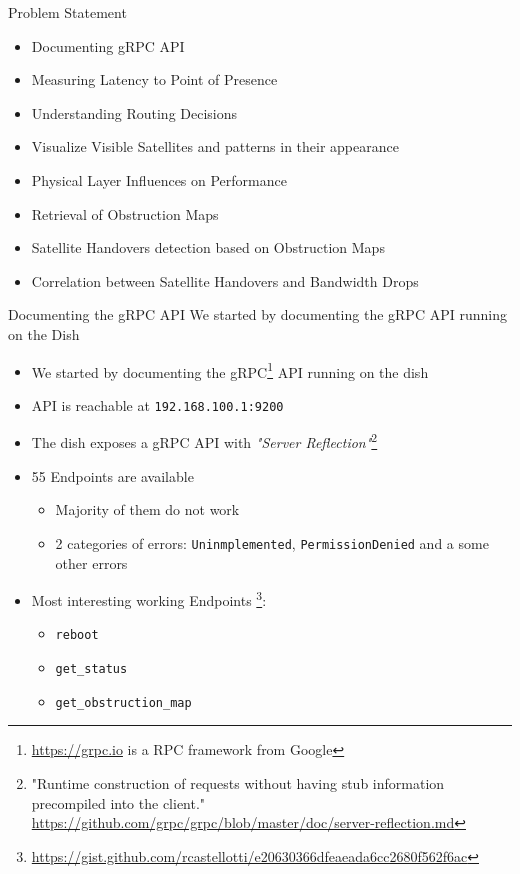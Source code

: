 \documentclass[NET,english,beameralt]{tumbeamer}
\begin{document}
\begin{frame}{Problem Statement}
    \color{red}{should I remove this slide?}
    \begin{itemize}
        \item Documenting gRPC API
        \item Measuring Latency to Point of Presence
        \item Understanding Routing Decisions
        \item Visualize Visible Satellites and patterns in their appearance
        \item Physical Layer Influences on Performance
        \item Retrieval of Obstruction Maps
        \item Satellite Handovers detection based on Obstruction Maps
        \item Correlation between Satellite Handovers and Bandwidth Drops   
    \end{itemize}
\end{frame}

\begin{frame}{Documenting the gRPC API}
    We started by documenting the gRPC API running on the Dish
    \begin{itemize}
        \item We started by documenting the gRPC\footnote{\url{https://grpc.io} is a RPC framework from Google} API running on the dish
        \item API is reachable at \texttt{192.168.100.1:9200}
        \item The dish exposes a gRPC API with \emph{"Server Reflection"}\footnote{"Runtime construction of requests without having stub
            information precompiled into the client." \url{https://github.com/grpc/grpc/blob/master/doc/server-reflection.md}}
        \item 55 Endpoints are available
        \begin{itemize}
            \item Majority of them do not work
            \item 2 categories of errors: \texttt{Uninmplemented}, \texttt{PermissionDenied} and a some other errors 
        \end{itemize}
        \item Most interesting working Endpoints \footnote{\url{https://gist.github.com/rcastellotti/e20630366dfeaeada6cc2680f562f6ac}}: 
            \begin{itemize}
                \item \texttt{reboot}
                \item \texttt{get\_status}
                \item \texttt{get\_obstruction\_map}
            \end{itemize}
    \end{itemize}
\end{frame}
\end{document}
